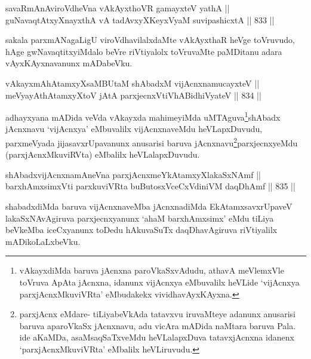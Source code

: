 \begin{shl}
savaRmAnAviroVdheVna vAkAyxthoVR gamayxteV yathA || \\
guNavaqtAtxyX\s nayxthA vA tadAvxyXKeyxVyaM suvipashicxtA \hfill || 833 ||  
\end{shl}

\begin{artha}
sakala parxmANagaLigU viroVdhavilalxdaMte vAkAyxthaR heVge toVruvudo, hAge gwNavaqtitxyiMdalo beVre riVtiyalolx toVruvaMte paMDitanu adara vAyxKAyxnavanunx mADabeVku.
\end{artha}


\begin{shl}
vAkayxmAhAtamxyXsaMBUtaM shAbadxM vijAcnxnamucayxteV || \\
meVyayAthAtamxyXtoV jAtA parxjecnxVtiVhABidhiVyateV \hfill || 834 ||  
\end{shl}

\begin{artha}
adhayxyana mADida veVda vAkayxda mahimeyiMda uMTAguva\footnote{vAkayxdiMda baruva jAcnxna paroVkaSxvAdudu, athavA meVlemxVle toVruva ApAta jAcnxna, idanunx vijAcnxya eMbuvalilx heVLide `vijAcnxya parxjAcnxMkuviVRta' eMbudakekx vividhavAyxKAyxna.}shAbadx jAcnxnavu `vijAcnxya' eMbuvalilx vijAcnxnaveMdu heVLapxDuvudu, parxmeVyada jijasavxrUpavanunx anusarisi baruva jAcnxnavu\footnote{parxjAcnx eMdare- tiLiyabeVkAda tatavxvu iruvaMteye adanunx anusarisi baruva aparoVkaSx jAcnxnavu, adu vicAra mADida naMtara baruva Pala. ide aKaMDa, asaMsaqSaTxveMdu heVLalapxDuva tatavxjAcnxna idanenx `parxjAcnxMkuviVRta' eMbalilx heVLiruvudu.}parxjecnxyeMdu (parxjAcnxMkuviRVta) eMbalilx heVLalapxDuvudu.
\end{artha}


\begin{shl}
shAbadxvijAcnxnamAneVna parxjAcnxmeYkAtamxyXlakaSxNAmf || \\
barxhAmxsimxVti parxkuviVRta buButosxVceCxVdiniVM daqDhAmf \hfill || 835 ||  
\end{shl}

\begin{artha}
shabadxdiMda baruva vijAcnxnaveMba jAcnxnadiMda EkAtamxsavxrUpaveV lakaSxNAvAgiruva parxjecnxyanunx `ahaM barxhAmxsimx' eMdu tiLiya beVkeMba iceCxyanunx toDedu hAkuvaSuTx daqDhavAgiruva riVtiyalilx mADikoLaLxbeVku.
\end{artha}

